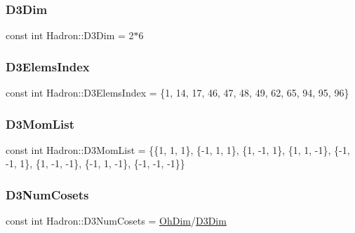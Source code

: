 \mbox{\label{namespaceHadron_ab94267da351bd0fdc72c0d49d22e617b}} 
\subsubsection{\texorpdfstring{D3Dim}{D3Dim}}
{\footnotesize\ttfamily const int Hadron\+::\+D3\+Dim = 2$\ast$6}

\mbox{\label{namespaceHadron_a222de40612665f1829700d29a3f27eae}} 
\subsubsection{\texorpdfstring{D3ElemsIndex}{D3ElemsIndex}}
{\footnotesize\ttfamily const int Hadron\+::\+D3\+Elems\+Index = \{1, 14, 17, 46, 47, 48, 49, 62, 65, 94, 95, 96\}}

\mbox{\label{namespaceHadron_a704848c20f046c1a4918279e713ec12a}} 
\subsubsection{\texorpdfstring{D3MomList}{D3MomList}}
{\footnotesize\ttfamily const int Hadron\+::\+D3\+Mom\+List = \{\{1, 1, 1\}, \{-\/1, 1, 1\}, \{1, -\/1, 1\}, \{1, 1, -\/1\}, \{-\/1, -\/1, 1\}, \{1, -\/1, -\/1\}, \{-\/1, 1, -\/1\}, \{-\/1, -\/1, -\/1\}\}}

\mbox{\label{namespaceHadron_a495e958948d0b6cdeb09a3f94e11c014}} 
\subsubsection{\texorpdfstring{D3NumCosets}{D3NumCosets}}
{\footnotesize\ttfamily const int Hadron\+::\+D3\+Num\+Cosets = \mbox{\hyperlink{namespaceHadron_a2bea98b7ecd13619ef78b6d204d59707}{Oh\+Dim}}/\mbox{\hyperlink{namespaceHadron_ab94267da351bd0fdc72c0d49d22e617b}{D3\+Dim}}}

\mbox{\label{namespaceHadron_a9af222d257dfd087f91192daf5876c6c}} 
